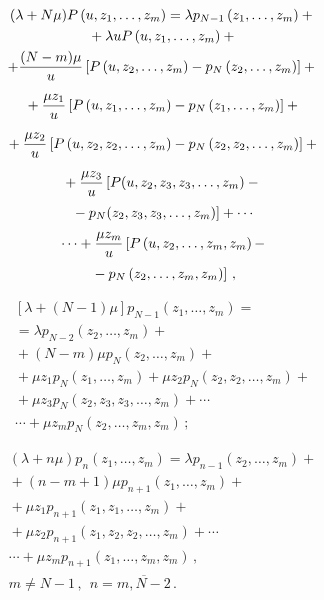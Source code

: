 \begin{multicols}{2}
\vspace*{-24pt}

\noindent
\begin{multline}
\label{bat-z-2}
(\lambda+N\mu) P\left(u,z_1,\ldots,z_{m}\right)
= \lambda p_{N-1}\left(z_1,\ldots,z_{m}\right) +{}\\
{}+
\lambda u P\left(u,z_1,\ldots,z_{m}\right) +{}
\\
+
\displaystyle\frac{\displaystyle (N-m) \mu\mathstrut}{\displaystyle u\mathstrut}
\left[P\left(u,z_2,\ldots,z_{m}\right) - p_{N}\left(z_2,\ldots,z_{m}\right)\right] +{}\\
{}+
\displaystyle\frac{\displaystyle \mu z_1\mathstrut}{\displaystyle u\mathstrut}\left[P\left(u,z_1,\ldots,z_{m}\right) - p_{N}\left(z_1,\ldots,z_{m}\right)\right]
+{}
\\
{}+ \displaystyle\frac{\displaystyle \mu z_2\mathstrut}{\displaystyle u\mathstrut}\left[P\left(u,z_2,z_2,\ldots,z_{m}\right)
- p_{N}\left(z_2,z_2,\ldots,z_{m}\right)\right]+{}
\\
{}+
\displaystyle\frac{\displaystyle \mu z_3\mathstrut}{\displaystyle u\mathstrut}\left[P(u,z_2,z_3,z_3,\ldots,z_{m}) -{}\right.\\
\left.{}-
p_{N}(z_2,z_3,z_3,\ldots,z_{m})\right]+\cdots{}
\\
{} \cdots + \displaystyle\frac{\displaystyle \mu z_m\mathstrut}{\displaystyle u\mathstrut}\left[P\left(u,z_2,\ldots,z_{m},z_m\right)-\right.\\
\left.{}-p_{N}\left(z_2,\ldots,z_{m},z_m\right)\right]\,,
\end{multline}

\vspace*{-12pt}

\noindent
\begin{multline}
\label{bat-z-3}
\left[\lambda+(N-1)\mu\right] p_{N-1}\left(z_1,\ldots,z_{m}\right)={}\\
{}=
\lambda p_{N-2}\left(z_2,\ldots,z_{m}\right)+{}\\
{}+(N-m) \mu p_{N}\left(z_2,\ldots,z_{m}\right)
+{}
\\
{}+ \mu z_1 p_{N}\left(z_1,\ldots,z_{m}\right) + \mu z_2 p_{N}\left(z_2,z_2,\ldots,z_{m}\right)
+{}
\\
{}+
\mu z_3 p_{N}\left(z_2,z_3,z_3,\ldots,z_{m}\right) +
\cdots{}\\
{}\cdots + \mu z_m p_{N}\left(z_2,\ldots,z_{m},z_m\right)\,;
\end{multline}

\vspace*{-12pt}

\noindent
\begin{multline}
\label{bat-z-4}
(\lambda+n\mu) p_{n}\left(z_1,\ldots,z_{m}\right)
= \lambda p_{n-1}(z_2,\ldots,z_{m}) +{}\\
{}+
(n-m+1) \mu p_{n+1}\left(z_1,\ldots,z_{m}\right)
+{}
\\
{}+
\mu z_1 p_{n+1}\left(z_1,z_1,\ldots,z_{m}\right)+{}\\
{}+ \mu z_2 p_{n+1}\left(z_1,z_2,z_2,\ldots,z_{m}\right)
+\cdots{}
\\
{} \cdots +
\mu z_m p_{n+1}\left(z_1,\ldots,z_{m},z_m\right)\,,\\ 
m \ne N-1\,, \ \ 
n=\overline{m,N-2}\,.
\end{multline}


\end{multicols}
